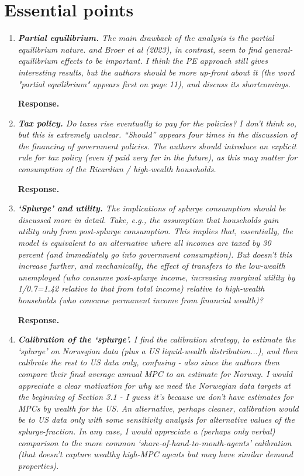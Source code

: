 \documentclass[12pt,letterpaper,english]{article}
\begin{document}
\section{Essential points}
\begin{enumerate}
	\item \textit{\textbf{Partial equilibrium.} The main drawback of the analysis is the partial equilibrium nature. \citet{kekre2022unemp} and Broer et al (2023), in contrast, seem to find general-equilibrium effects to be important. I think the PE approach still gives interesting results, but the authors should be more up-front about it (the word "partial equilibrium" appears first on page 11), and discuss its shortcomings.}
	
	\noindent \textbf{Response.} 
	
	\item \textit{\textbf{Tax policy.} Do taxes rise eventually to pay for the policies? I don't think so, but this is extremely unclear. ``Should'' appears four times in the discussion of the financing of government policies. The authors should introduce an explicit rule for tax policy (even if paid very far in the future), as this may matter for consumption of the Ricardian / high-wealth households.}
	
	\noindent \textbf{Response.} 
	
	\item \textit{\textbf{`Splurge' and utility.} The implications of splurge consumption should be discussed more in detail. Take, e.g., the assumption that households gain utility only from post-splurge consumption. This implies that, essentially, the model is equivalent to an alternative where all incomes are taxed by 30 percent (and immediately go into government consumption). But doesn't this increase further, and mechanically, the effect of transfers to the low-wealth unemployed (who consume post-splurge income, increasing marginal utility by 1/0.7=1.42 relative to that from total income) relative to high-wealth households (who consume permanent income from financial wealth)?}
		
	\noindent \textbf{Response.} 

	\item \textit{\textbf{Calibration of the `splurge'.} I find the calibration strategy, to estimate the `splurge' on Norwegian data (plus a US liquid-wealth distribution...), and then calibrate the rest to US data only, confusing - also since the authors then compare their final average annual MPC to an estimate for Norway. I would appreciate a clear motivation for why we need the Norwegian data targets at the beginning of Section 3.1 - I guess it's because we don't have estimates for MPCs by wealth for the US. An alternative, perhaps cleaner, calibration would be to US data only with some sensitivity analysis for alternative values of the splurge-fraction. In any case, I would appreciate a (perhaps only verbal) comparison to the more common `share-of-hand-to-mouth-agents' calibration (that doesn't capture wealthy high-MPC agents but may have similar demand properties).}
	

\end{enumerate}
\end{document}

